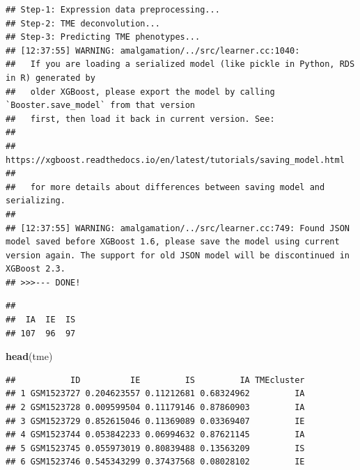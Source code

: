 \documentclass[
  12pt,
]{book}
\newenvironment{Shaded}{\begin{snugshade}}{\end{snugshade}}
\newcommand{\FunctionTok}[1]{\textcolor[rgb]{0.13,0.29,0.53}{\textbf{#1}}}
\newcommand{\NormalTok}[1]{#1}
\newcommand{\SpecialCharTok}[1]{\textcolor[rgb]{0.81,0.36,0.00}{\textbf{#1}}}
\begin{document}
\begin{verbatim}
## Step-1: Expression data preprocessing...
## Step-2: TME deconvolution...
## Step-3: Predicting TME phenotypes...
## [12:37:55] WARNING: amalgamation/../src/learner.cc:1040: 
##   If you are loading a serialized model (like pickle in Python, RDS in R) generated by
##   older XGBoost, please export the model by calling `Booster.save_model` from that version
##   first, then load it back in current version. See:
## 
##     https://xgboost.readthedocs.io/en/latest/tutorials/saving_model.html
## 
##   for more details about differences between saving model and serializing.
## 
## [12:37:55] WARNING: amalgamation/../src/learner.cc:749: Found JSON model saved before XGBoost 1.6, please save the model using current version again. The support for old JSON model will be discontinued in XGBoost 2.3.
## >>>--- DONE!
\end{verbatim}

\begin{Shaded}
\end{Shaded}

\begin{verbatim}
## 
##  IA  IE  IS 
## 107  96  97
\end{verbatim}

\begin{Shaded}
\begin{Highlighting}[]
\FunctionTok{head}\NormalTok{(tme)}
\end{Highlighting}
\end{Shaded}

\begin{verbatim}
##           ID          IE         IS         IA TMEcluster
## 1 GSM1523727 0.204623557 0.11212681 0.68324962         IA
## 2 GSM1523728 0.009599504 0.11179146 0.87860903         IA
## 3 GSM1523729 0.852615046 0.11369089 0.03369407         IE
## 4 GSM1523744 0.053842233 0.06994632 0.87621145         IA
## 5 GSM1523745 0.055973019 0.80839488 0.13563209         IS
## 6 GSM1523746 0.545343299 0.37437568 0.08028102         IE
\end{verbatim}

\begin{Shaded}
\end{Shaded}
\end{document}
